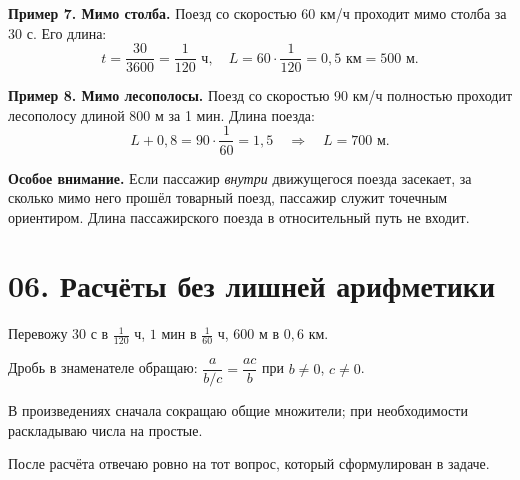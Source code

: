 \documentclass[a4paper,12pt]{article}
\newcommand{\key}[1]{\textcolor{darkaccent}{\bfseries #1}}
\newcommand{\ruleline}{\par\vspace{.15em}{\color{accent!65}\hrule height .6pt}\vspace{.65em}}
\newcommand{\checks}[1]{\item[$\square$] #1}
\begin{document}
\key{Пример 7. Мимо столба.} Поезд со скоростью 60 км/ч проходит мимо столба за 30 с. Его длина:
\[
 t=\frac{30}{3600}=\frac1{120}\text{ ч},\quad
 L=60\cdot\frac1{120}=0{,}5\text{ км}=\boxed{500\text{ м}}.
\]

\key{Пример 8. Мимо лесополосы.} Поезд со скоростью 90 км/ч полностью проходит лесополосу длиной 800 м за 1 мин. Длина поезда:
\[
 L+0{,}8=90\cdot\frac1{60}=1{,}5
 \quad\Longrightarrow\quad \boxed{L=700\text{ м}}.
\]

\key{Особое внимание.} Если пассажир \emph{внутри} движущегося поезда засекает, за сколько мимо него прошёл товарный поезд, пассажир служит точечным ориентиром. Длина пассажирского поезда в относительный путь не входит.

\section*{06. Расчёты без лишней арифметики}
\ruleline
\begin{checklist}
\checks{Перевожу $30$ с в $\tfrac1{120}$ ч, $1$ мин в $\tfrac1{60}$ ч, $600$ м в $0{,}6$ км.}
\checks{Дробь в знаменателе обращаю: $\dfrac{a}{b/c}=\dfrac{ac}{b}$ при $b\ne0$, $c\ne0$.}
\checks{В произведениях сначала сокращаю общие множители; при необходимости раскладываю числа на простые.}
\checks{После расчёта отвечаю ровно на тот вопрос, который сформулирован в задаче.}
\end{checklist}
\end{document}
